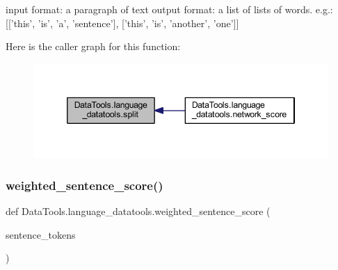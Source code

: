 \begin{DoxyVerb}input format: a paragraph of text
output format: a list of lists of words.
    e.g.: [['this', 'is', 'a', 'sentence'], ['this', 'is', 'another', 'one']]
\end{DoxyVerb}
 Here is the caller graph for this function\+:
\nopagebreak
\begin{figure}[H]
\begin{center}
\leavevmode
\includegraphics[width=346pt]{namespace_data_tools_1_1language__datatools_afe62d5ebd637d46169960a826c034ef5_icgraph}
\end{center}
\end{figure}
\mbox{\label{namespace_data_tools_1_1language__datatools_a4d48db81c591efbde6b9b4f57764954c}} 
\subsubsection{\texorpdfstring{weighted\+\_\+sentence\+\_\+score()}{weighted\_sentence\_score()}}
{\footnotesize\ttfamily def Data\+Tools.\+language\+\_\+datatools.\+weighted\+\_\+sentence\+\_\+score (\begin{DoxyParamCaption}\item[{}]{sentence\+\_\+tokens }\end{DoxyParamCaption})}

